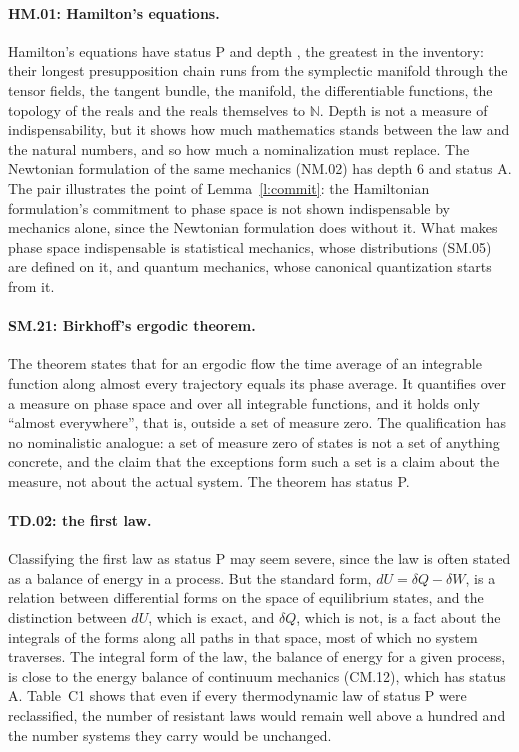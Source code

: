 \documentclass{situationist-preprint}
\begin{document}
\paragraph{HM.01: Hamilton's equations.} Hamilton's equations have status P and depth \depthMax, the greatest in the inventory: their longest presupposition chain runs from the symplectic manifold through the tensor fields, the tangent bundle, the manifold, the differentiable functions, the topology of the reals and the reals themselves to $\mathbb N$. Depth is not a measure of indispensability, but it shows how much mathematics stands between the law and the natural numbers, and so how much a nominalization must replace. The Newtonian formulation of the same mechanics (NM.02) has depth 6 and status A. The pair illustrates the point of Lemma~\ref{l:commit}: the Hamiltonian formulation's commitment to phase space is not shown indispensable by mechanics alone, since the Newtonian formulation does without it. What makes phase space indispensable is statistical mechanics, whose distributions (SM.05) are defined on it, and quantum mechanics, whose canonical quantization starts from it.

\paragraph{SM.21: Birkhoff's ergodic theorem.} The theorem states that for an ergodic flow the time average of an integrable function along almost every trajectory equals its phase average. It quantifies over a measure on phase space and over all integrable functions, and it holds only \enquote{almost everywhere}, that is, outside a set of measure zero. The qualification has no nominalistic analogue: a set of measure zero of states is not a set of anything concrete, and the claim that the exceptions form such a set is a claim about the measure, not about the actual system. The theorem has status P.

\paragraph{TD.02: the first law.} Classifying the first law as status P may seem severe, since the law is often stated as a balance of energy in a process. But the standard form, $dU = \delta Q - \delta W$, is a relation between differential forms on the space of equilibrium states, and the distinction between $dU$, which is exact, and $\delta Q$, which is not, is a fact about the integrals of the forms along all paths in that space, most of which no system traverses. The integral form of the law, the balance of energy for a given process, is close to the energy balance of continuum mechanics (CM.12), which has status A. Table~C1 shows that even if every thermodynamic law of status P were reclassified, the number of resistant laws would remain well above a hundred and the number systems they carry would be unchanged.
\end{document}
